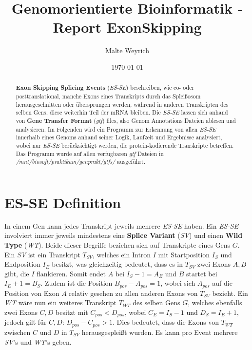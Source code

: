 \documentclass[12pt]{article}
\title{Genomorientierte Bioinformatik - Report ExonSkipping}
\author{
  Malte Weyrich
}
\date{\today}
\begin{document}
\maketitle
\begin{abstract}
    \textbf{Exon Skipping Splicing Events} (\textit{ES-SE}) beschreiben, wie co- oder posttranslational,
    manche Exons eines Transkripts durch das Splei\ss osom herausgeschnitten oder übersprungen werden, während
    in anderen Transkripten des selben Gens, diese weiterhin Teil der mRNA bleiben.
    Die \textit{ES-SE} lassen sich anhand von \textbf{Gene Transfer Format} (\textit{gtf}) files,
    also Genom Annotations Dateien ablesen und analysieren. 
    Im Folgenden wird ein Programm zur Erkennung von allen \textit{ES-SE} innerhalb eines Genoms
    anhand seiner Logik, Laufzeit und Ergebnisse analysiert, wobei nur \textit{ES-SE} berücksichtigt werden,
    die protein-kodierende Transkripte betreffen. Das Programm wurde auf allen verfügbaren
    \textit{gtf} Dateien in \textit{/mnt/biosoft/praktikum/genprakt/gtfs/} ausgeführt.

\end{abstract}

\newpage



\section{ES-SE Definition}\label{sec:problem}
In einem Gen kann jedes Transkript jeweils mehrere \textit{ES-SE} haben.
Ein \textit{ES-SE} involviert immer jeweils mindestens eine \textbf{Splice Variant} (\textit{SV}) und einen 
\textbf{Wild Type} (\textit{WT}). Beide dieser Begriffe beziehen sich auf Transkripte eines Gens $G$.
Ein \textit{SV} ist ein Transkript $T_{SV}$, welches ein Intron $I$ mit Startposition $I_{S}$ und Endposition
$I_{E}$ besitzt, was gleichzeitig bedeutet, dass es in $T_{SV}$ zwei Exons $A, B$ gibt, die $I$ flankieren. Somit endet $A$ bei $I_{S} - 1 = A_{E}$ und $B$ startet bei $I_{E} + 1 = B_{S}$.
Zudem ist die Position $B_{pos} - A_{pos} = 1$, wobei sich $A_{pos}$ auf die Position von Exon $A$ relativ gesehen 
zu allen anderen Exons von $T_{SV}$ bezieht.
Ein \textit{WT} wäre nun ein weiteres Transkript $T_{WT}$ des selben Gens $G$, welches ebenfalls
zwei Exons $C, D$ besitzt mit $C_{pos} < D_{pos}$, wobei $C_{E} = I_{S} - 1$ und $D_{S} = I_{E} + 1$, 
jedoch gilt für $C, D$: $D_{pos} - C_{pos} > 1$. 
Dies bedeutet, dass die Exons von $T_{WT}$ zwischen $C$ und $D$ in $T_{SV}$ herausgesplei\ss t wurden.
Es kann pro Event mehrere \textit{SV}'s und \textit{WT}'s geben.
\end{document}
